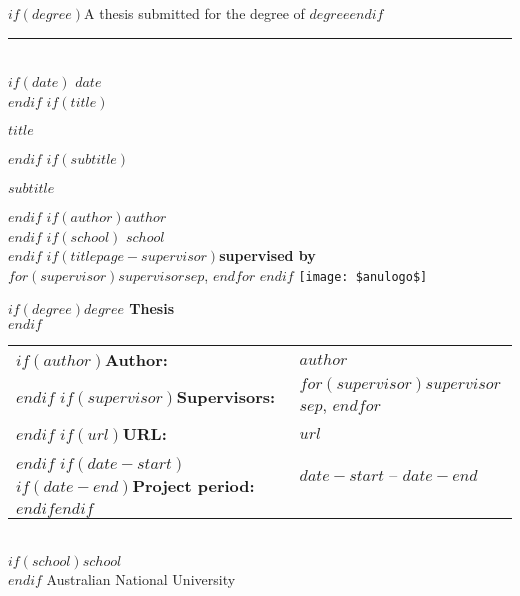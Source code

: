 
\begin{titlepage}
  \begin{flushright}%
    \vspace{50mm}
    $if(degree)${\small A thesis submitted for the degree of {\it $degree$}}$endif$
    \rule[1ex]{\textwidth}{1pt}\\
    $if(date)${\fontsize{9}{0} $date$}\\$endif$
    \vspace{25mm}
    $if(title)${\fontsize{34}{38}\bfseries $title$\par}
      \vspace{12mm}$endif$
  $if(subtitle)$
	\parbox{\textwidth}{
	\begin{flushright}
		\fontsize{28}{30} $subtitle$
	\end{flushright}}
	$endif$
    \vfill
    $if(author)${\fontsize{20}{0}\bfseries $author$}\\
    \vspace{2mm}$endif$
    $if(school)${\fontsize{8}{0} $school$}\\
    \vspace{35mm}$endif$
    $if(titlepage-supervisor)${\fontsize{10}{0}\bfseries supervised by}\\
    $for(supervisor)$$supervisor$$sep$, $endfor$
    $endif$
    \vspace{2.0cm}
		\texttt{[image: \$anulogo\$]}\\
 \end{flushright}%

 \clearpage\thispagestyle{empty}
 \normalfont
 \vspace*{\fill}
 \noindent
 $if(degree)${\bf $degree$ Thesis}\\[2mm]$endif$
 \begin{tabular}{lp{10cm}}
   $if(author)${\bf Author:} & $author$\\[2mm]$endif$
   $if(supervisor)${\bf Supervisors:} & $for(supervisor)$$supervisor$$sep$, $endfor$\\[2mm]$endif$
   $if(url)${\bf URL:} & $url$\\[2mm]$endif$
   $if(date-start)$$if(date-end)${\bf Project period:} & $date-start$ -- $date-end$ \\[2mm]$endif$$endif$
 \end{tabular}\\[2mm]

$if(school)$\noindent $school$\\$endif$
\noindent Australian National University

\end{titlepage}
\setlength{\parindent}{0pt}
\setlength{\parskip}{1ex plus 0.5ex minus 0.2ex}









